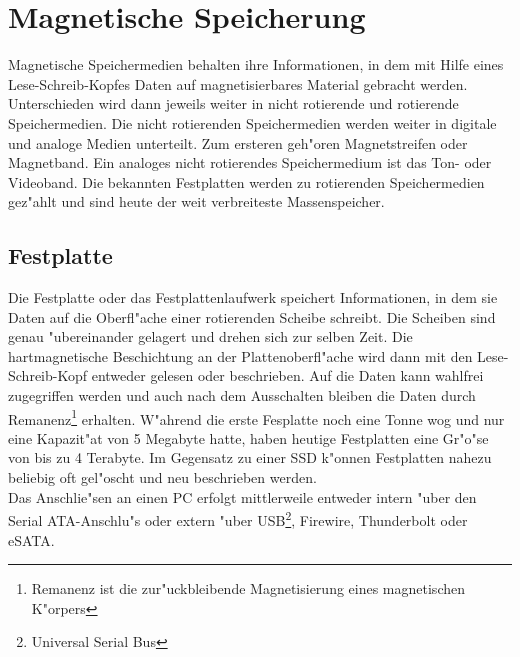 				
			
			
			
    \section{Magnetische Speicherung}
    \label{ch:Technisch:sec:Magnetische Speicherung}
    
    Magnetische Speichermedien behalten ihre Informationen, in dem mit Hilfe eines Lese-Schreib-Kopfes Daten auf magnetisierbares Material gebracht werden. Unterschieden wird dann jeweils weiter in nicht rotierende und rotierende Speichermedien. Die nicht rotierenden Speichermedien werden weiter in digitale und analoge Medien unterteilt. Zum ersteren geh"oren Magnetstreifen oder Magnetband. Ein analoges nicht rotierendes Speichermedium ist das Ton- oder Videoband. Die bekannten Festplatten werden zu rotierenden Speichermedien gez"ahlt und sind heute der weit verbreiteste Massenspeicher.

        \subsection{Festplatte}
        \label{ch:Technisch:sec:Magnetische Speicherung:sub:Festplatte}
        
            Die Festplatte oder das Festplattenlaufwerk speichert Informationen, in dem sie Daten auf die Oberfl"ache einer rotierenden Scheibe schreibt. Die Scheiben sind genau "ubereinander gelagert und drehen sich zur selben Zeit. Die hartmagnetische Beschichtung an der Plattenoberfl"ache wird dann mit den Lese-Schreib-Kopf entweder gelesen oder beschrieben. Auf die Daten kann wahlfrei zugegriffen werden und auch nach dem Ausschalten bleiben die Daten durch Remanenz\footnote{Remanenz ist die zur"uckbleibende Magnetisierung eines magnetischen K"orpers} erhalten. W"ahrend die erste Fesplatte noch eine Tonne wog und nur eine Kapazit"at von 5 Megabyte hatte, haben heutige Festplatten eine Gr"o"se von bis zu 4 Terabyte. Im Gegensatz zu einer SSD k"onnen Festplatten nahezu beliebig oft gel"oscht und neu beschrieben werden.
            \\
            Das Anschlie"sen an einen PC erfolgt mittlerweile entweder intern "uber den Serial ATA-Anschlu"s oder extern "uber USB\footnote{Universal Serial Bus}, Firewire, Thunderbolt oder eSATA. 
    

